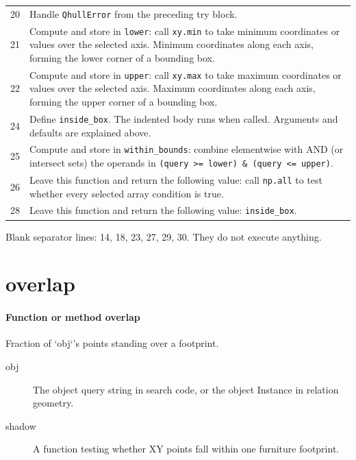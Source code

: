 \documentclass[11pt,a4paper]{book}
\begin{document}
\begin{longtable}{r p{}}
20 & Handle \texttt{QhullError} from the preceding try block. \\

21 & Compute and store in \texttt{lower}: call \texttt{xy.min} to take minimum coordinates or values over the selected axis. Minimum coordinates along each axis, forming the lower corner of a bounding box. \\

22 & Compute and store in \texttt{upper}: call \texttt{xy.max} to take maximum coordinates or values over the selected axis. Maximum coordinates along each axis, forming the upper corner of a bounding box. \\

24 & Define \texttt{inside\_box}. The indented body runs when called. Arguments and defaults are explained above. \\

25 & Compute and store in \texttt{within\_bounds}: combine elementwise with AND (or intersect sets) the operands in \texttt{(query >= lower) \& (query <= upper)}.  \\

26 & Leave this function and return the following value: call \texttt{np.all} to test whether every selected array condition is true. \\

28 & Leave this function and return the following value: \texttt{inside\_box}. \\

\end{longtable}

Blank separator lines: 14, 18, 23, 27, 29, 30. They do not execute anything.

\section{overlap}

\paragraph{Function or method overlap}
Fraction of `obj`'s points standing over a footprint.

\begin{description}
\item[obj] The object query string in search code, or the object Instance in relation geometry.
\item[shadow] A function testing whether XY points fall within one furniture footprint.
\end{description}
\end{document}

